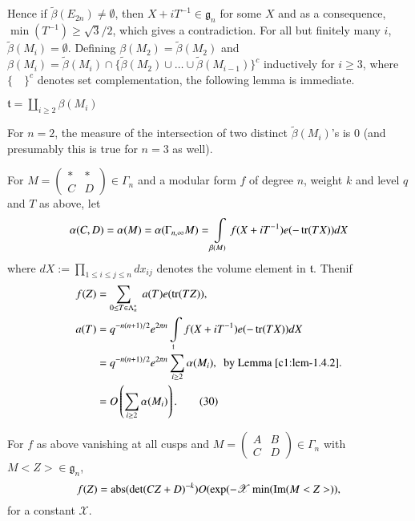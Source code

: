 Hence if $\tilde{\beta}(E_{2n})\neq \emptyset$, then
$X+iT^{-1}\in\mathfrak{g}_{n}$ for some $X$ and as a consequence,
$\min(T^{-1})\geq \sqrt{3}/2$, which gives a contradiction. For all
but finitely many $i$, $\tilde{\beta}(M_{i})=\emptyset$. Defining
$\beta(M_{2})=\tilde{\beta}(M_{2})$ and
$\beta(M_{i})=\tilde{\beta}(M_{i})\cap
\{\tilde{\beta}(M_{2})\cup\ldots\cup\tilde{\beta}(M_{i-1})\}^{c}$
inductively for $i\geq 3$, where $\{\quad\}^{c}$ denotes set
complementation, the following lemma is immediate.

\begin{sublemma}\label{c1:lem-1.4.2}
$\mathfrak{t}=\coprod\limits_{i\geq 2}\beta(M_{i})$
\end{sublemma}

For $n=2$, the measure of the intersection of two distinct
$\tilde{\beta}(M_{i})$'s is $0$ (and presumably this is true for
$n=3$ as well).

For $M=\left(\begin{smallmatrix} \ast & \ast\\ C & D
\end{smallmatrix}\right)\in \Gamma_{n}$ and a modular form $f$ of
degree $n$, weight $k$ and level $q$ and $T$ as above, let 
$$
\alpha(C,D)=\alpha(M)=\alpha(\Gamma_{n,\infty}M)=\int\limits_{\beta(M)}f(X+iT^{-1})e(-\operatorname{tr}(TX))dX
$$
where $dX:=\prod\limits_{1\leq i\leq j\leq n}dx_{ij}$ denotes the
volume element in $\mathfrak{t}$. Then\pageoriginale if
\begin{align*}
f(Z) &= \sum_{0\leq T\in\Lambda^*_{n}} \;  a(T)e(\operatorname{tr}(TZ)),\\
a(T) &= q^{-n(n+1)/2}e^{2\pi
  n}\int\limits_{\mathfrak{t}}f(X+iT^{-1})e(-\operatorname{tr}(TX))dX\\
&= q^{-n(n+1)/2}e^{2\pi n}\sum_{i\geq 2}\alpha(M_{i}), \text{ \  by
  Lemma \ref{c1:lem-1.4.2}.}\\
&= O\left(\sum_{i\geq 2}\alpha(M_{i})\right).\tag{30}\label{c1:eq30}
\end{align*}

\begin{sublemma}\label{c1:lem-1.4.3}
For $f$ as above vanishing at all cusps and
$M=\left(\begin{smallmatrix} A & B\\ C & D
\end{smallmatrix}\right)\in \Gamma_{n}$ with
$M<Z>\in\mathfrak{g}_{n}$,
$$
f(Z)=\operatorname{abs} (\det (CZ+D)^{-k})O(\exp(-\mathscr{X}\min(\operatorname{Im}(M<Z>)),
$$
for a constant $\mathscr{X}$.
\end{sublemma}

